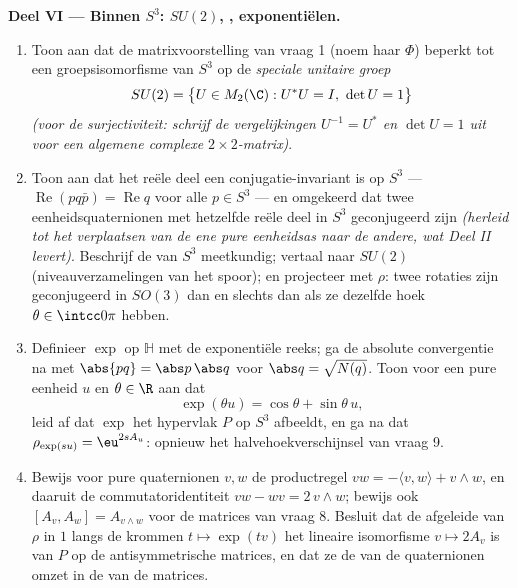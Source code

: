 \begin{problem}
\medskip
\noindent\textbf{Deel VI --- Binnen $S^3$: $SU(2)$,
, exponentiëlen.}
\begin{enumerate}[resume]
  \item Toon aan dat de matrixvoorstelling van vraag 1 (noem haar
        $\Phi$) beperkt tot een groepsisomorfisme van $S^3$ op de
        \emph{speciale unitaire groep}
        \[
        SU(2) = \bigl\{U \in M_2(\C) : U^*U = I,\ \det U =
        1\bigr\}
        \]
        \emph{(voor de surjectiviteit: schrijf de vergelijkingen
        $U^{-1} = U^*$ en $\det U = 1$ uit voor een algemene
        complexe $2\times2$-matrix)}.
  \item Toon aan dat het reële deel een conjugatie-invariant is
        op $S^3$ --- $\operatorname{Re}(pq\bar p) =
        \operatorname{Re}q$ voor alle $p \in S^3$ --- en
        omgekeerd dat twee eenheidsquaternionen met hetzelfde
        reële deel in $S^3$ geconjugeerd zijn \emph{(herleid tot
        het verplaatsen van de ene pure eenheidsas naar de
        andere, wat Deel II levert)}. Beschrijf de
         van $S^3$ meetkundig; vertaal naar
        $SU(2)$ (niveauverzamelingen van het spoor); en projecteer
        met $\rho$: twee rotaties zijn geconjugeerd in $SO(3)$
        dan en slechts dan als ze dezelfde hoek $\theta \in
        \intcc0\pi$ hebben.
  \item Definieer $\exp$ op $\mathbb H$ met de exponentiële
        reeks; ga de absolute convergentie na met $\abs{pq} =
        \abs p\,\abs q$ voor $\abs q = \sqrt{N(q)}$. Toon voor
        een pure eenheid $u$ en $\theta \in \R$ aan dat
        \[
        \exp(\theta u) = \cos\theta + \sin\theta\,u ,
        \]
        leid af dat $\exp$ het hypervlak $P$ op $S^3$ afbeeldt,
        en ga na dat $\rho_{\exp(su)} = \eu^{2sA_u}$: opnieuw het
        halvehoekverschijnsel van vraag 9.
  \item Bewijs voor pure quaternionen $v, w$ de productregel $vw
        = -\langle v, w\rangle + v\wedge w$, en daaruit de
        commutatoridentiteit $vw - wv = 2\,v\wedge w$; bewijs ook
        $[A_v, A_w] = A_{v\wedge w}$ voor de matrices van vraag
        8. Besluit dat de afgeleide van $\rho$ in $1$ langs de
        krommen $t \mapsto \exp(tv)$ het lineaire isomorfisme $v
        \mapsto 2A_v$ is van $P$ op de antisymmetrische matrices,
        en dat ze de  van de quaternionen omzet in de
         van de matrices.
\end{enumerate}


\end{problem}
